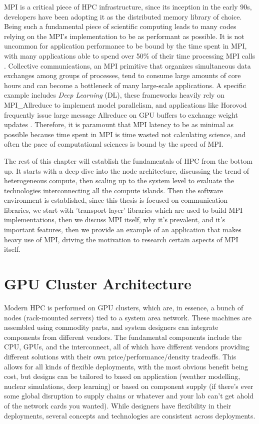 MPI is a critical piece of HPC infrastructure, since its inception in the early 90s, developers have been adopting it as the distributed memory library of choice.
Being such a fundamental piece of scientific computing leads to many codes relying on the MPI's implementation to be as performant as possible.  
It is not uncommon for application performance to be bound by the time spent in MPI, with many applications able to spend over 50\% of their time processing MPI calls \cite{Chunduri2018CharacterizeMPIonProd}.
Collective communications, an MPI primitive that organizes simultaneous data exchanges among groups of processes, tend to consume large amounts of core hours and can become a bottleneck of many large-scale applications.
A specific example includes \textit{Deep Learning} (DL), these frameworks heavily rely on MPI\_Allreduce to implement model parallelism, and applications like Horovod frequently issue large message Allreduce on GPU buffers to exchange weight updates \cite{Awan2019CommProfDLonClusters, Jain2019PerfCharDNNTFPT, Alizadeh2022PAPCollDL}.
Therefore, it is paramount that MPI latency to be as minimal as possible because time spent in MPI is time wasted not calculating science, and often the pace of computational sciences is bound by the speed of MPI.

The rest of this chapter will establish the fundamentals of HPC from the bottom up.
It starts with a deep dive into the node architecture, discussing the trend of heterogeneous compute, then scaling up to the system level to evaluate the technologies interconnecting all the compute islands.
Then the software environment is established, since this thesis is focused on communication libraries, we start with 'transport-layer' libraries which are used to build MPI implementations, then we discuss MPI itself, why it's prevalent, and it's important features, then we provide an example of an application that makes heavy use of MPI, driving the motivation to research certain aspects of MPI itself.

\section{GPU Cluster Architecture}
Modern HPC is performed on GPU clusters, which are, in essence, a bunch of nodes (rack-mounted servers) tied to a system area network.
These machines are assembled using commodity parts, and system designers can integrate components from different vendors.
The fundamental components include the CPU, GPUs, and the interconnect, all of which have different vendors providing different solutions with their own price/performance/density tradeoffs.
This allows for all kinds of flexible deployments, with the most obvious benefit being cost, but designs can be tailored to based on application (weather modelling, nuclear simulations, deep learning) or based on component supply (if there's ever some global disruption to supply chains or whatever and your lab can't get ahold of the network cards you wanted).
While designers have flexibility in their deployments, several concepts and technologies  are consistent across deployments.

